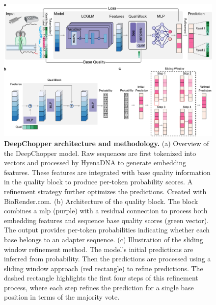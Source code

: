\documentclass[pdflatex,sn-nature, lineno]{sn-jnl}%
\begin{document}
\begin{figure}[!ht]
    \includegraphics[height=0.63\columnwidth]{finals/figure1}
    \caption{{\bf DeepChopper architecture and methodology.} (a) Overview of the DeepChopper model. Raw sequences are first tokenized into vectors and processed by HyenaDNA to generate embedding features. These features are integrated with base quality information in the quality block to produce per-token probability scores. A refinement strategy further optimizes the predictions. Created with BioRender.com. (b) Architecture of the quality block. The block combines a \gls{mlp} (purple) with a residual connection to process both embedding features and sequence base quality scores (green vector). The output provides per-token probabilities indicating whether each base belongs to an adapter sequence. (c) Illustration of the sliding window refinement method. The model's initial predictions are inferred from probability. Then the predictions are processed using a sliding window approach (red rectangle) to refine predictions. The dashed rectangle highlights the first four steps of this refinement process, where each step refines the prediction for a single base position in terms of the majority vote.}\label{fig:f1}
\end{figure}
\end{document}
